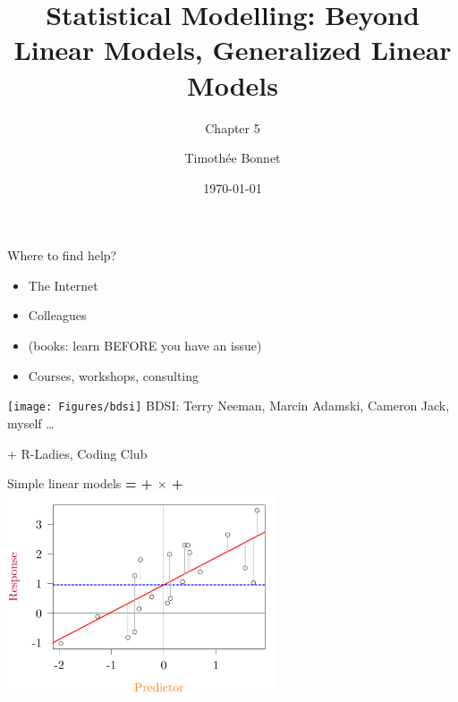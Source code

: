 \documentclass[10pt]{beamer}
\title{Statistical Modelling: Beyond Linear Models, Generalized Linear Models}
\subtitle{Chapter 5}
\author{Timoth\'ee Bonnet}
\date{\today}
\begin{document}




\begin{frame}[plain]{Where to find help?}
    \begin{block}{}
        \begin{itemize}
         \item The Internet
         \item Colleagues
         \item (books: learn BEFORE you have an issue)
         \item Courses, workshops, consulting
        \end{itemize}
  \pause  
    \texttt{[image: Figures/bdsi]}
    BDSI: Terry Neeman, Marcin Adamski, Cameron Jack, myself \dots
    \end{block}
\pause
    \alert{\large + R-Ladies, Coding Club}
\end{frame}


\begin{frame}{}
\maketitle

\end{frame}

\begin{frame}{Simple linear models}
  \textbf{{\color{purple}{Response}} = {\color{blue}{Intercept}} + {\color{red}{Slope}} $\times$ {\color{orange}{Predictor}} + {\color{gray}{Error}}} \\

\centering
\includegraphics[width=0.6\textwidth]{Figures/figure/lmprinc-1}
\end{frame}
\end{document}
